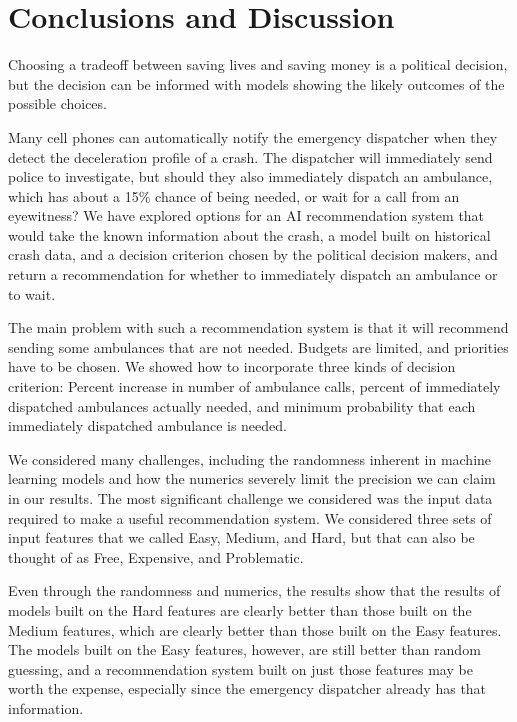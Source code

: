 \section{Conclusions and Discussion}
\label{conclusions}

Choosing a tradeoff between saving lives and saving money is a political decision, but the decision can be informed with models showing the likely outcomes of the possible choices.  

Many cell phones can automatically notify the emergency dispatcher when they detect the deceleration profile of a crash.  The dispatcher will immediately send police to investigate, but should they also immediately dispatch an ambulance, which has about a 15\% chance of being needed, or wait for a call from an eyewitness?  We have explored options for an AI recommendation system that would take the known information about the crash, a model built on historical crash data, and a decision criterion chosen by the political decision makers, and return a recommendation for whether to immediately dispatch an ambulance or to wait.  

The main problem with such a recommendation system is that it will recommend sending some ambulances that are not needed.  Budgets are limited, and priorities have to be chosen.  We showed how to incorporate three kinds of decision criterion:  Percent increase in number of ambulance calls, percent of immediately dispatched ambulances actually needed, and minimum probability that each immediately dispatched ambulance is needed.  

We considered many challenges, including the randomness inherent in machine learning models and how the numerics severely limit the precision we can claim in our results.  The most significant challenge we considered was the input data required to make a useful recommendation system.  We considered three sets of input features that we called Easy, Medium, and Hard, but that can also be thought of as Free, Expensive, and Problematic.  

Even through the randomness and numerics, the results show that the results of models built on the Hard features are clearly better than those built on the Medium features, which are clearly better than those built on the Easy features.  The models built on the Easy features, however, are still better than random guessing, and a recommendation system built on just those features may be worth the expense, especially since the emergency dispatcher already has that information.  

